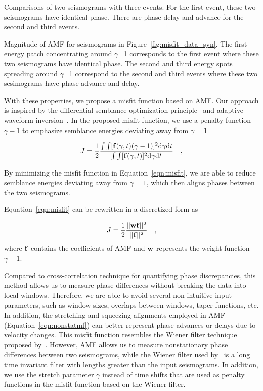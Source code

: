 {\label{fig:misfit_data_syn} 
Comparisons of two seismograms with three events. 
For the first event, these two seismograms have identical phase.
There are phase delay and advance for the second and third events. 
}

{\label{fig:misfit_filt} 
Magnitude of AMF for seismograms in 
Figure~\ref{fig:misfit_data_syn}. The first energy patch concentrating around $\gamma$=1 
corresponds to the first event where these two seismograms have identical phase. 
The second and third energy spots spreading around $\gamma$=1 correspond to the 
second and third events where these two sesimograms have phase advance and delay.}

With these properties, we propose a misfit function based on AMF. Our approach is inspired by 
the differential semblance optimization principle~\citep{Symes1991, PShen2008} and adaptive 
waveform inversion~\citep{Warner2014}. In the proposed misfit function, we use a penalty 
function $\gamma-1$ to emphasize semblance energies deviating away from $\gamma=1$ 

\begin{equation}
\label{eqn:misfit}
J=\frac{1}{2} \frac{\int \int [{\bf f}(\gamma,t)(\gamma-1)]^2 {\rm d}\gamma {\rm d} t}{\int \int [{\bf f}(\gamma,t)]^2 {\rm d}\gamma {\rm d}t }
\quad , 
\end{equation}

By minimizing the misfit function in Equation~\ref{eqn:misfit}, 
we are able to reduce semblance energies 
deviating away from $\gamma=1$, which then aligns phases between the two seismograms. 

Equation~\ref{eqn:misfit} can be rewritten in a discretized form as 

\begin{equation}
\label{eqn:misfit_disc}
J=\frac{1}{2} \frac{||{\bf w f}||^2}{||{\bf f}||^2}
\quad ,
\end{equation}
where ${\bf f}$ contains the coefficients of AMF and ${\bf w}$ represents the 
weight function $\gamma-1$.

Compared to cross-correlation technique for quantifying phase discrepancies, 
this method allows us to measure phase differences without breaking the data into local windows. 
Therefore, we are able to avoid several non-intuitive 
input parameters, such as window sizes, overlaps between windows, taper functions, etc. 
In addition, the stretching and squeezing 
alignments employed in AMF (Equation~\ref{eqn:nonstatmf}) can better represent phase advances
or delays due to velocity changes. This misfit function resembles the Wiener filter technique proposed 
by~\cite{Warner2014}. However, AMF allows us to measure nonstationary phase differences between 
two seismograms, while the Wiener filter used by~\cite{Warner2014} is a long time invariant filter with 
lengths greater than the input seismograms. In addition, we use the stretch parameter $\gamma$ instead of 
time shifts that are used as penalty functions in the misfit function based on the Wiener filter.

